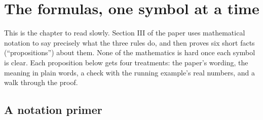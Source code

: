 \chapter{The formulas, one symbol at a time}

This is the chapter to read slowly. Section III of the paper uses mathematical notation to say precisely what the three rules do, and then proves six short facts (``propositions'') about them. None of the mathematics is hard once each symbol is clear. Each proposition below gets four treatments: the paper's wording, the meaning in plain words, a check with the running example's real numbers, and a walk through the proof.

\section{A notation primer}

